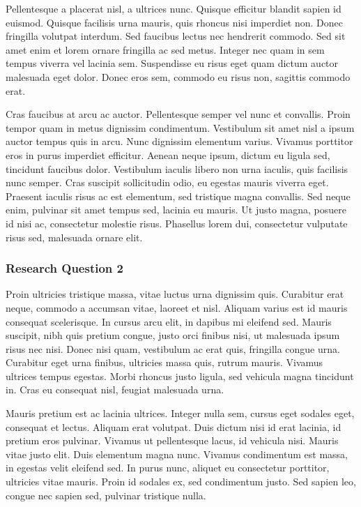 Pellentesque a placerat nisl, a ultrices nunc. Quisque efficitur blandit sapien id euismod. Quisque facilisis urna mauris, quis rhoncus nisi imperdiet non. Donec fringilla volutpat interdum. Sed faucibus lectus nec hendrerit commodo. Sed sit amet enim et lorem ornare fringilla ac sed metus. Integer nec quam in sem tempus viverra vel lacinia sem. Suspendisse eu risus eget quam dictum auctor malesuada eget dolor. Donec eros sem, commodo eu risus non, sagittis commodo erat.

Cras faucibus at arcu ac auctor. Pellentesque semper vel nunc et convallis. Proin tempor quam in metus dignissim condimentum. Vestibulum sit amet nisl a ipsum auctor tempus quis in arcu. Nunc dignissim elementum varius. Vivamus porttitor eros in purus imperdiet efficitur. Aenean neque ipsum, dictum eu ligula sed, tincidunt faucibus dolor. Vestibulum iaculis libero non urna iaculis, quis facilisis nunc semper. Cras suscipit sollicitudin odio, eu egestas mauris viverra eget. Praesent iaculis risus ac est elementum, sed tristique magna convallis. Sed neque enim, pulvinar sit amet tempus sed, lacinia eu mauris. Ut justo magna, posuere id nisi ac, consectetur molestie risus. Phasellus lorem dui, consectetur vulputate risus sed, malesuada ornare elit.

\subsubsection{Research Question 2}

Proin ultricies tristique massa, vitae luctus urna dignissim quis. Curabitur erat neque, commodo a accumsan vitae, laoreet et nisl. Aliquam varius est id mauris consequat scelerisque. In cursus arcu elit, in dapibus mi eleifend sed. Mauris suscipit, nibh quis pretium congue, justo orci finibus nisi, ut malesuada ipsum risus nec nisi. Donec nisi quam, vestibulum ac erat quis, fringilla congue urna. Curabitur eget urna finibus, ultricies massa quis, rutrum mauris. Vivamus ultrices tempus egestas. Morbi rhoncus justo ligula, sed vehicula magna tincidunt in. Cras eu consequat nisl, feugiat malesuada urna.

Mauris pretium est ac lacinia ultrices. Integer nulla sem, cursus eget sodales eget, consequat et lectus. Aliquam erat volutpat. Duis dictum nisi id erat lacinia, id pretium eros pulvinar. Vivamus ut pellentesque lacus, id vehicula nisi. Mauris vitae justo elit. Duis elementum magna nunc. Vivamus condimentum est massa, in egestas velit eleifend sed. In purus nunc, aliquet eu consectetur porttitor, ultricies vitae mauris. Proin id sodales ex, sed condimentum justo. Sed sapien leo, congue nec sapien sed, pulvinar tristique nulla.

